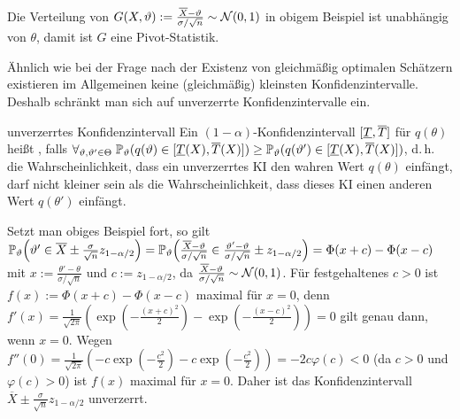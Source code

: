 \begin{Bsp}
    Die Verteilung von $G(X, \vartheta) := \frac{\overline{X} - \vartheta}{\sigma/\sqrt{n}} \sim
    \mathcal{N}(0, 1)$ in obigem Beispiel ist unabhängig von $\theta$,
    damit ist $G$ eine Pivot-Statistik.
\end{Bsp}

\linie
\pagebreak

\begin{Bem}
    Ähnlich wie bei der Frage nach der Existenz von gleichmäßig optimalen Schätzern existieren
    im Allgemeinen keine (gleichmäßig) kleinsten Konfidenzintervalle.
    Deshalb schränkt man sich auf unverzerrte Konfidenzintervalle ein.
\end{Bem}

\begin{Def}{unverzerrtes Konfidenzintervall}
    Ein $(1 - \alpha)$-Konfidenzintervall $[\underline{T}, \overline{T}]$ für $q(\theta)$ heißt
    , falls
    $\forall_{\vartheta, \vartheta' \in \Theta}\; \mathbb{P}_\vartheta(q(\vartheta) \in [\underline{T}(X), \overline{T}(X)]) \ge
    \mathbb{P}_\vartheta(q(\vartheta') \in [\underline{T}(X), \overline{T}(X)])$,
    d.\,h. die Wahrscheinlichkeit, dass ein unverzerrtes KI den wahren Wert $q(\theta)$ einfängt,
    darf nicht kleiner sein als die Wahrscheinlichkeit, dass dieses KI einen anderen Wert
    $q(\theta')$ einfängt.
\end{Def}

\begin{Bsp}
    Setzt man obiges Beispiel fort,
    so gilt\\
    $\mathbb{P}_\vartheta\!\left(\vartheta' \in \overline{X} \pm \frac{\sigma}{\sqrt{n}} z_{1-\alpha/2}\right)
    = \mathbb{P}_\vartheta\!\left(\frac{\overline{X} - \vartheta}{\sigma/\sqrt{n}} \in
    \frac{\vartheta' - \vartheta}{\sigma/\sqrt{n}} \pm z_{1-\alpha/2}\right)
    = \Phi(x + c) - \Phi(x - c)$ mit $x := \frac{\theta' - \theta}{\sigma/\sqrt{n}}$ und
    $c := z_{1-\alpha/2}$,
    da $\frac{\overline{X} - \vartheta}{\sigma/\sqrt{n}} \sim \mathcal{N}(0, 1)$.
    Für festgehaltenes $c > 0$ ist $f(x) := \Phi(x + c) - \Phi(x - c)$ maximal für $x = 0$,
    denn $f'(x) = \frac{1}{\sqrt{2\pi}} \left(\exp\!\left(-\frac{(x+c)^2}{2}\right) -
    \exp\!\left(-\frac{(x-c)^2}{2}\right)\right) = 0$ gilt genau dann, wenn $x = 0$.
    Wegen $f''(0) = \frac{1}{\sqrt{2\pi}} \left(-c \exp\!\left(-\frac{c^2}{2}\right) -
    c \exp\!\left(-\frac{c^2}{2}\right)\right) = -2c \varphi(c) < 0$
    (da $c > 0$ und $\varphi(c) > 0$) ist $f(x)$ maximal für $x = 0$.
    Daher ist das Konfidenzintervall $\overline{X} \pm \frac{\sigma}{\sqrt{n}} z_{1-\alpha/2}$
    unverzerrt.
\end{Bsp}

